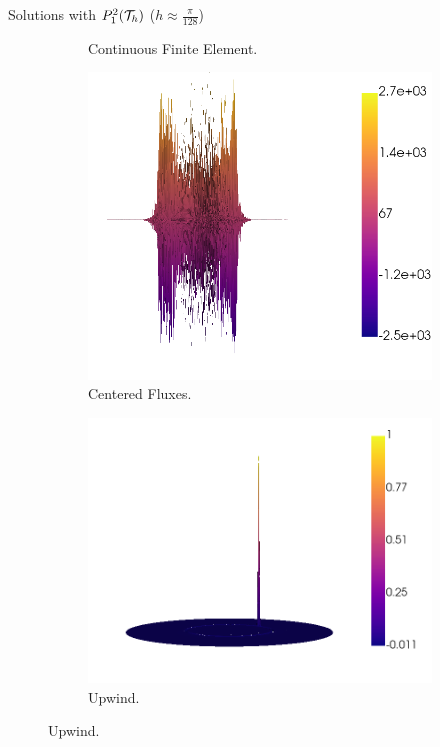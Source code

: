 \begin{frame}{Solutions with $\relax{P}_1^2(\mathcal{T}_h)$ ($h\approx\frac{\pi}{128}$)}
\begin{figure}[h!]
\begin{subfigure}[b]{0.49\textwidth}
						\caption{Continuous Finite Element.}
					\end{subfigure}
					\begin{subfigure}[b]{0.49\textwidth}
						\centering
						\includegraphics[scale=0.16]{img/Conveccion_Reaccion/strong/conv_react_u_CF_nx-256.png}
						\caption{Centered Fluxes.}
					\end{subfigure}
					\begin{subfigure}[b]{0.49\textwidth}
						\centering
						\includegraphics[scale=0.16]{img/Conveccion_Reaccion/strong/conv_react_u_UPW_nx-256.png}
						\caption{Upwind.}
					\end{subfigure}
				\end{figure}
				\end{frame}

